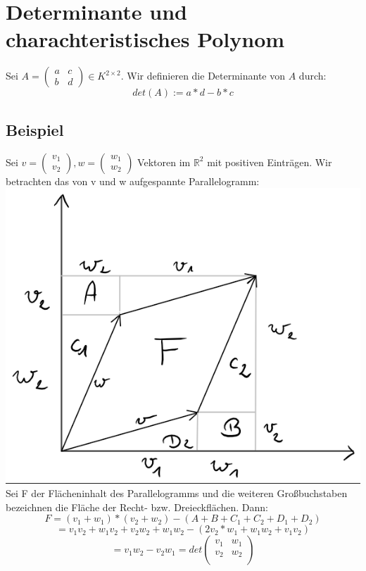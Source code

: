 \documentclass{scrbook}
\begin{document}
\chapter{Determinante und charachteristisches Polynom}
Sei $A=\left(
\begin{array}{cc}
a&c\\
b&d
\end{array}
\right) \in K^{2 \times 2}$. Wir definieren die Determinante von $A$ durch:
\[det(A):= a*d-b*c\]
\section{Beispiel}
Sei $v=\left(
\begin{array}{c}
v_1\\v_2
\end{array}
\right),w=\left(
\begin{array}{c}
w_1\\w_2
\end{array}
\right)
$ Vektoren im $\mathbb{R}^2$ mit positiven Einträgen. Wir betrachten das von v und w aufgespannte Parallelogramm:\\
\includegraphics{Parallelogram1.png}\\
Sei F der Flächeninhalt des Parallelogramms und die weiteren Großbuchstaben bezeichnen die Fläche der Recht- bzw. Dreieckflächen. Dann:
\[F=(v_1+w_1)*(v_2+w_2) - (A+B+C_1+C_2+D_1+D_2)\]\[=v_1v_2+w_1v_2+v_2w_2+w_1w_2-(2v_2*w_1+w_1w_2+v_1v_2)\]\[=v_1w_2-v_2w_1 = det\left(
\begin{array}{cc}
v_1&w_1\\
v_2&w_2\\
\end{array}
\right)\] 
\end{document}
